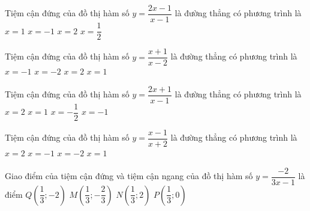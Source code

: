 \begin{ex}%
    Tiệm cận đứng của đồ thị hàm số $ y=\dfrac{2x-1}{x-1}$ là đường thẳng có phương trình là
    \choice
    {\True $x=1$}
    {$x=-1$}
    {$x=2$}
    {$x=\dfrac{1}{2}$}
\end{ex}
\begin{ex}%
    Tiệm cận đứng của đồ thị hàm số $ y=\dfrac{x+1}{x-2}$ là đường thẳng có phương trình là
    \choice
    {$x=-1$}
    {$x=-2$}
    {\True $x=2$}
    {$x=1$}
\end{ex}
\begin{ex}%
    Tiệm cận đứng của đồ thị hàm số $ y=\dfrac{2x+1}{x-1}$ là đường thẳng có phương trình là
    \choice
    {$x=2$}
    {\True $x=1$}
    {$x=-\dfrac{1}{2}$}
    {$x=-1$}
\end{ex}
\begin{ex}%
    Tiệm cận đứng của đồ thị hàm số $ y=\dfrac{x-1}{x+2}$ là đường thẳng có phương trình là
    \choice
    {$x=2$}
    {$x=-1$}
    {\True $x=-2$}
    {$x=1$}
\end{ex}
\begin{ex}%
    Giao điểm của tiệm cận đứng và tiệm cận ngang của đồ thị hàm số $y=\dfrac{-2}{3x-1}$ là điểm
    \choice
    {$Q\left(\dfrac{1}{3};-2\right)$}
    {$M\left(\dfrac{1}{3};-\dfrac{2}{3}\right)$}
    {$N\left(\dfrac{1}{3};2\right)$}
    {\True $P\left(\dfrac{1}{3};0\right)$}
\end{ex}
